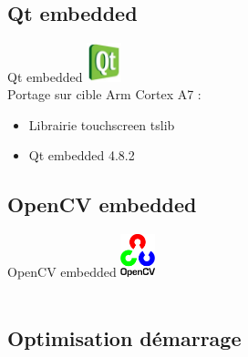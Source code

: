\documentclass[11pt]{beamer}
\begin{document}
	
	\subsection{Qt embedded}
	\begin{frame}[label=pageQt]{Qt embedded}
	 \includegraphics[width=1cm]{common/Qt.jpeg}\\
			  Portage sur cible Arm Cortex A7 : 
		\begin{itemize}
		\pause
			  \item<+-|alert@+> Librairie touchscreen tslib \hyperlink{tslib}{}\\
			  \item<+-|alert@+> Qt embedded 4.8.2 \hyperlink{Qt}{}\\
			  
		\end{itemize}
	\end{frame}
	

	
	
	\subsection{OpenCV embedded}
	\begin{frame}[label=pageopenCV]{OpenCV embedded}
	\includegraphics[width=1cm]{common/opencv.png}\\
	\hyperlink{openCV}{}\\
		\begin{center}
			
		\end{center}
	\end{frame}
	
	
	
	\subsection{Optimisation démarrage}
\end{document}
